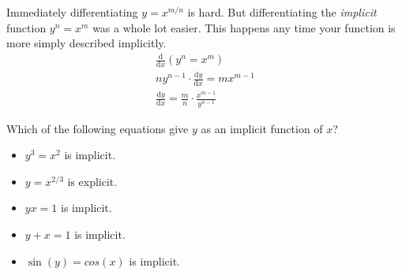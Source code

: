 Immediately differentiating $y=x^{m/n}$ is hard. But differentiating the \textit{implicit} function $y^n=x^m$ was a whole lot easier. This happens any time your function is more simply described implicitly.
\begin{gather*}
    \frac{\mathrm{d}}{\mathrm{d}x}(y^n=x^m) \\
    ny^{n-1}\cdot\frac{\mathrm{d}y}{\mathrm{d}x}=mx^{m-1} \\
    \frac{\mathrm{d}y}{\mathrm{d}x}=\frac{m}{n}\cdot\frac{x^{m-1}}{y^{n-1}}
\end{gather*}
\begin{eg}
    Which of the following equations give $y$ as an implicit function of $x$?
    \begin{itemize}
        \item $y^3=x^2$ is implicit. 
        \item $y=x^{2/3}$ is explicit.
        \item $yx=1$ is implicit.
        \item $y+x=1$ is implicit.
        \item $\sin(y)=cos(x)$ is implicit.
    \end{itemize}
\end{eg}

